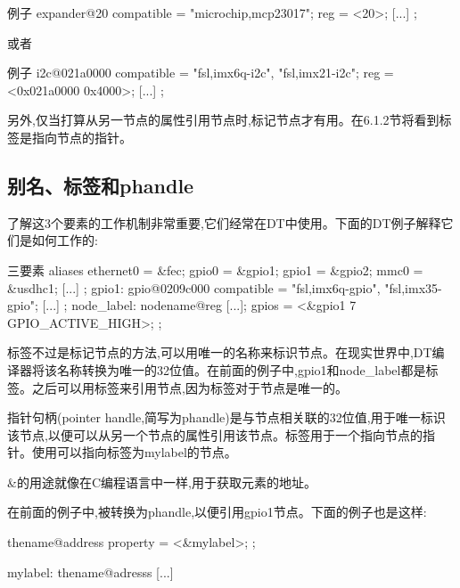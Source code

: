 \documentclass[lang=cn,newtx,10pt,scheme=chinese]{elegantbook}
\begin{document}
\begin{mycode}{例子}
expander@20 {
    compatible = "microchip,mcp23017";
    reg = <20>;
    [...]
};
\end{mycode}

或者

\begin{mycode}{例子}
i2c@021a0000 {
    compatible = "fsl,imx6q-i2c", "fsl,imx21-i2c";
    reg = <0x021a0000 0x4000>;
    [...]
};
\end{mycode}

另外,仅当打算从另一节点的属性引用节点时,标记节点才有用。在6.1.2节将看到标签是指向节点的指针。

\subsection{别名、标签和phandle}

了解这3个要素的工作机制非常重要,它们经常在DT中使用。下面的DT例子解释它们是如何工作的:

\begin{mycode}{三要素}
aliases {
    ethernet0 = &fec;
    gpio0 = &gpio1;
    gpio1 = &gpio2;
    mmc0 = &usdhc1;
    [...]
};
gpio1: gpio@0209c000 {
    compatible = "fsl,imx6q-gpio", "fsl,imx35-gpio";
    [...]
};
node_label: nodename@reg {
    [...];
    gpios = <&gpio1 7 GPIO_ACTIVE_HIGH>;
};
\end{mycode}

标签不过是标记节点的方法,可以用唯一的名称来标识节点。在现实世界中,DT编译器将该名称转换为唯一的32位值。在前面的例子中,gpio1和node\_label都是标签。之后可以用标签来引用节点,因为标签对于节点是唯一的。

指针句柄(pointer handle,简写为phandle)是与节点相关联的32位值,用于唯一标识该节点,以便可以从另一个节点的属性引用该节点。标签用于一个指向节点的指针。使用可以指向标签为mylabel的节点。

\begin{marker}
    \&的用途就像在C编程语言中一样,用于获取元素的地址。
\end{marker}

在前面的例子中,被转换为phandle,以便引用gpio1节点。下面的例子也是这样:

\begin{mycode}
thename@address {
    property = <&mylabel>;
};

mylabel: thename@adresss {
    [...]
}
\end{mycode}
\end{document}
